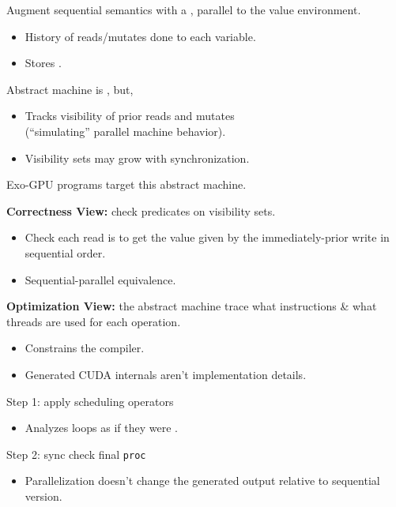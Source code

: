 \newpage
{}

{\LARGE

Augment sequential semantics with a , parallel to the value environment.
\begin{itemize}
  \item History of reads/mutates done to each variable.
  \item Stores .
\end{itemize}

\vspace{5mm}

Abstract machine is , but,
\begin{itemize}
  \item Tracks visibility of prior reads and mutates\\(``simulating'' parallel machine behavior).
  \item Visibility sets may grow with synchronization.
\end{itemize}

}


\newpage
{}

{\LARGE
Exo-GPU programs target this abstract machine.

\textbf{Correctness View:} check predicates on visibility sets.
\begin{itemize}
  \item Check each read is  to get the value given by the immediately-prior write in sequential order.
  \item Sequential-parallel equivalence.
\end{itemize}

\textbf{Optimization View:} the abstract machine trace  what instructions \& what threads are used for each operation.
\begin{itemize}
  \item Constrains the compiler.
  \item Generated CUDA internals aren't implementation details.
\end{itemize}

}


\newpage
{}

{\LARGE
Step 1: apply scheduling operators
\begin{itemize}
  \item Analyzes  loops as if they were .
\end{itemize}

Step 2: sync check final \texttt{proc}
\begin{itemize}
  \item Parallelization doesn't change the generated output relative to sequential version.
\end{itemize}
}

